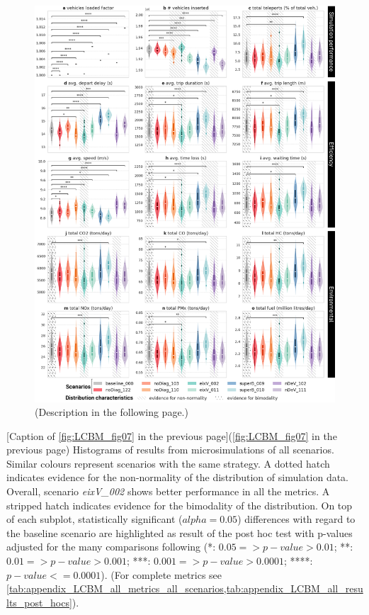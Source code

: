\begin{figure}[htbp!]
    \centering
    \includegraphics[width=1\textwidth]{LCBM_fig07.jpg}
    \caption*{(Description in the following page.)}
\end{figure}
[Caption of \cref{fig:LCBM_fig07} in the previous page]{(\cref{fig:LCBM_fig07} in the previous page) Histograms of results from microsimulations of all scenarios. Similar colours represent scenarios with the same strategy. A dotted hatch indicates evidence for the non-normality of the distribution of simulation data. Overall, scenario \emph{eixV\_002} shows better performance in all the metrics. A stripped hatch indicates evidence for the bimodality of the distribution. On top of each subplot, statistically significant ($alpha=0.05$) differences with regard to the baseline scenario are highlighted as result of the post hoc test with p-values adjusted for the many comparisons following \citep{Benjamini1995} (*: $0.05 => p-value > 0.01$; **: $0.01=> p-value > 0.001$; ***: $0.001=> p-value > 0.0001$; ****: $p-value<=0.0001$). (For complete metrics see \cref{tab:appendix_LCBM_all_metrics_all_scenarios,tab:appendix_LCBM_all_results_post_hocs}).}
\label{fig:LCBM_fig07}


